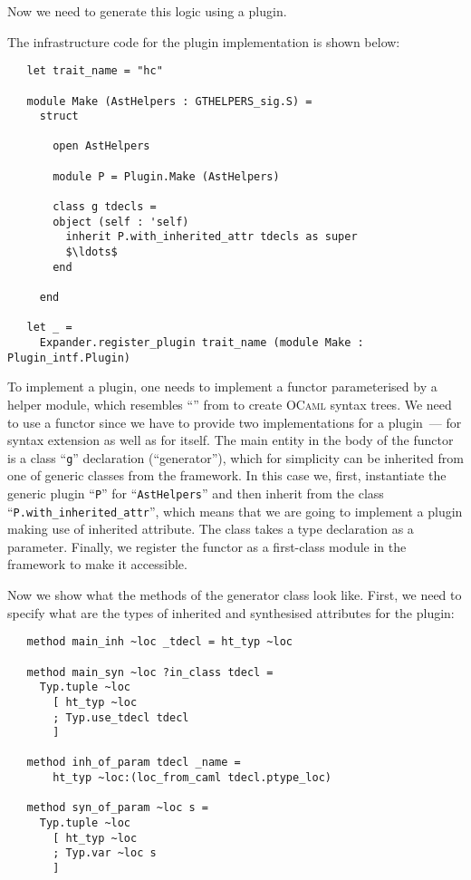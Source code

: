 Now we need to generate this logic using a plugin.

The infrastructure code for the plugin implementation is shown below:

\begin{lstlisting}
   let trait_name = "hc"
  
   module Make (AstHelpers : GTHELPERS_sig.S) =
     struct
     
       open AstHelpers

       module P = Plugin.Make (AstHelpers)

       class g tdecls =
       object (self : 'self)
         inherit P.with_inherited_attr tdecls as super
         $\ldots$
       end

     end

   let _ =
     Expander.register_plugin trait_name (module Make : Plugin_intf.Plugin)
\end{lstlisting}

To implement a plugin, one needs to implement a functor parameterised by a helper module, which resembles ``'' from
 to create \textsc{OCaml} syntax trees. We need to use a functor since we have to provide two implementations for
a plugin~--- for  syntax extension as well as for  itself. The main entity in the body of the functor is
a class ``\lstinline{g}'' declaration (``generator''), which for simplicity can be inherited from one of generic classes 
from the framework. In this case we, first, instantiate the generic plugin ``\lstinline{P}'' for ``\lstinline{AstHelpers}'' and
then inherit from the class ``\lstinline{P.with_inherited_attr}'', which means that we are going to implement a plugin
making use of inherited attribute. The class takes a type declaration as a parameter. Finally, we register the functor as a
first-class module in the framework to make it accessible.

Now we show what the methods of the generator class look like. First, we need to specify what are the types of inherited and
synthesised attributes for the plugin:

\begin{lstlisting}
   method main_inh ~loc _tdecl = ht_typ ~loc

   method main_syn ~loc ?in_class tdecl =
     Typ.tuple ~loc
       [ ht_typ ~loc
       ; Typ.use_tdecl tdecl
       ]

   method inh_of_param tdecl _name =
       ht_typ ~loc:(loc_from_caml tdecl.ptype_loc)

   method syn_of_param ~loc s =
     Typ.tuple ~loc
       [ ht_typ ~loc
       ; Typ.var ~loc s
       ]
\end{lstlisting}

